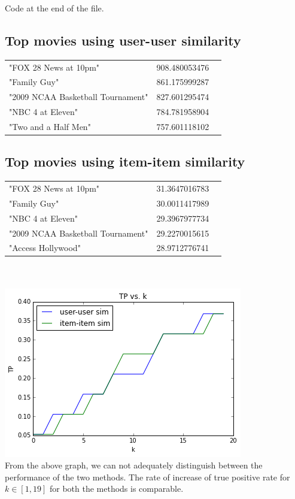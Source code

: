\documentclass[11pt]{article}
\begin{document}
{Code at the end of the file.

\subsection*{Top movies using user-user similarity}
\begin{tabular}{ l c r }
"FOX 28 News at 10pm" & 908.480053476\\
"Family Guy" & 861.175999287\\
"2009 NCAA Basketball Tournament" & 827.601295474\\
"NBC 4 at Eleven" & 784.781958904\\
"Two and a Half Men" & 757.601118102\\
\end{tabular}

\subsection*{Top movies using item-item similarity}
\begin{tabular}{ l c r }
"FOX 28 News at 10pm" & 31.3647016783\\
"Family Guy" & 30.0011417989\\
"NBC 4 at Eleven" & 29.3967977734\\
"2009 NCAA Basketball Tournament" & 29.2270015615\\
"Access Hollywood" & 28.9712776741\\
\end{tabular}\\
\\

\includegraphics*{q1cc}\\

From the above graph, we can not adequately distinguish between the performance of the two methods. The rate of increase of true positive rate for $k \in [1,19]$ for both the methods is comparable.

}
\end{document}
